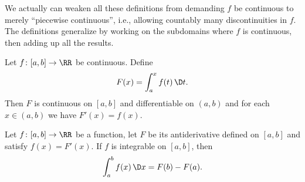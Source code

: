 \begin{node}
\begin{node}[On continuity]\label{calculus:integral-0007}%
We actually can weaken all these definitions from demanding $f$ be
continuous to merely ``piecewise continuous'', i.e., allowing countably
many discontinuities in $f$. The definitions generalize by working on
the subdomains where $f$ is continuous, then adding up all the results.
\end{node}
\end{node}

\begin{node}\label{calculus:integral-0008}%

\begin{theorem}\label{calculus:integral-0009}%
Let $f\colon[a,b]\to\RR$ be continuous. Define
\[F(x)=\int^{x}_{a}f(t)\,\D t.\]
Then $F$ is continuous on $[a,b]$ and differentiable on $(a,b)$ and
for each $x\in(a,b)$ we have $F'(x)=f(x)$.
\end{theorem}

\begin{theorem}\label{calculus:integral-000A}%
Let $f\colon[a,b]\to\RR$ be a function, let $F$ be its antiderivative
defined on $[a,b]$ and satisfy $f(x)=F'(x)$. If $f$ is integrable on
$[a,b]$, then
\[\int^{b}_{a}f(x)\,\D x=F(b)-F(a).\]
\end{theorem}
\end{node}

